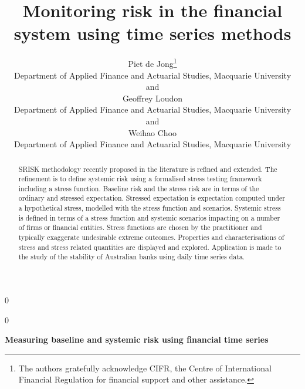 \documentclass[12pt]{article}
\newcommand{\blind}{0}
\begin{document}
%

\def\spacingset#1{\renewcommand{\baselinestretch}%
{#1}\small\normalsize} \spacingset{1}



\blind
{
  \title{\bf Monitoring  risk in the financial system using time series methods}
  \author{Piet de Jong\thanks{
    The authors gratefully acknowledge CIFR, the Centre of International Financial Regulation for financial support and other assistance.}\hspace{.2cm}\\
    Department of Applied Finance and Actuarial Studies, Macquarie University\\
    and \\
    Geoffrey Loudon\\
    Department of Applied Finance and Actuarial Studies, Macquarie University\\
    and\\
    Weihao Choo\\
    Department of Applied Finance and Actuarial Studies, Macquarie University}
  \maketitle
} \fi

\blind
{
  \bigskip
  \bigskip
  \bigskip
  \begin{center}
    {\LARGE\bf Measuring baseline and systemic risk using financial time series}
\end{center}
  \medskip
} \fi

\bigskip
\begin{abstract}
SRISK methodology recently proposed in the literature is refined and extended.  The refinement is to define  systemic risk using a formalised stress testing framework including a stress function.  Baseline risk and the stress risk  are in terms of the  ordinary and stressed expectation.  Stressed expectation is expectation computed  under a hypothetical  stress, modelled with the stress function and scenarios.  Systemic stress is defined in terms of a stress function and systemic scenarios impacting on a number of firms or financial entities.  Stress functions are chosen by the practitioner and typically exaggerate undesirable extreme outcomes.    Properties and characterisations of stress and stress related quantities are displayed and explored.     Application is made to the study of the stability of Australian banks using daily time series data.
\end{abstract}
\end{document}
